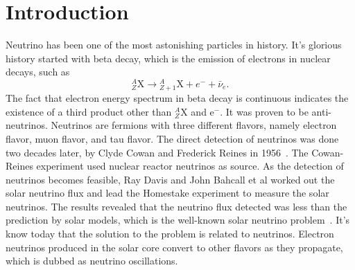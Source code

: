 \chapter{Introduction}
\label{introduction}

Neutrino has been one of the most astonishing particles in history. It's glorious history started with beta decay, which is the emission of electrons in nuclear decays, such as
\begin{equation*}
{}^A_Z \mathrm X \to {}_{Z+1}^A\mathrm X + e^- +\bar \nu_e .
\end{equation*}
The fact that electron energy spectrum in beta decay is continuous indicates the existence of a third product other than ${}^{A}_{Z}\mathrm X$ and $\mathrm e^-$. It was proven to be anti-neutrinos. Neutrinos are fermions with three different flavors, namely electron flavor, muon flavor, and tau flavor. The direct detection of neutrinos was done two decades later, by Clyde Cowan and Frederick Reines in 1956~\cite{Cowan1956}. The Cowan-Reines experiment used nuclear reactor neutrinos as source. As the detection of neutrinos becomes feasible, Ray Davis and John Bahcall et al worked out the solar neutrino flux and lead the Homestake experiment to measure the solar neutrinos. The results revealed that the neutrino flux detected was less than the prediction by solar models, which is the well-known solar neutrino problem~\cite{Bahcall1973}. It's know today that the solution to the problem is related to neutrinos. Electron neutrinos produced in the solar core convert to other flavors as they propagate, which is dubbed as neutrino oscillations. 

